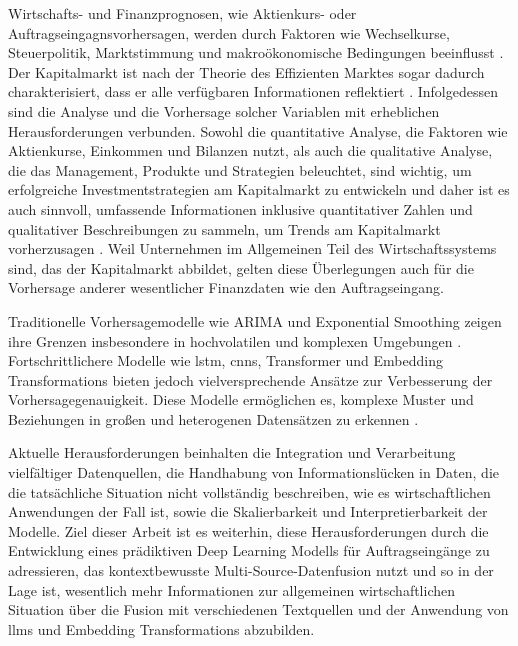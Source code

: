 \documentclass[lettersize,journal]{IEEEtran}
\begin{document}
Wirtschafts- und Finanzprognosen, wie Aktienkurs- oder Auftragseingagnsvorhersagen, werden durch Faktoren wie Wechselkurse, Steuerpolitik, Marktstimmung und makroökonomische Bedingungen beeinflusst \cite{Zhang2018ImprovinStockMarketPrediction}. Der Kapitalmarkt ist nach der Theorie des Effizienten Marktes sogar dadurch charakterisiert, dass er alle verfügbaren Informationen reflektiert \cite{Fama1970EfficientMarkets}. Infolgedessen sind die Analyse und die Vorhersage solcher Variablen mit erheblichen Herausforderungen verbunden. Sowohl die quantitative Analyse, die Faktoren wie Aktienkurse, Einkommen und Bilanzen nutzt, als auch die qualitative Analyse, die das Management, Produkte und Strategien beleuchtet, sind wichtig, um erfolgreiche Investmentstrategien am Kapitalmarkt zu entwickeln und daher ist es auch sinnvoll, umfassende Informationen inklusive quantitativer Zahlen und qualitativer Beschreibungen zu sammeln, um Trends am Kapitalmarkt vorherzusagen \cite{Zhang2018ImprovinStockMarketPrediction}. Weil Unternehmen im Allgemeinen Teil des Wirtschaftssystems sind, das der Kapitalmarkt abbildet, gelten diese Überlegungen auch für die Vorhersage anderer wesentlicher Finanzdaten wie den Auftragseingang.

Traditionelle Vorhersagemodelle wie ARIMA und Exponential Smoothing zeigen ihre Grenzen insbesondere in hochvolatilen und komplexen Umgebungen \cite{Wasserbacher2022machinelearningfpa}. Fortschrittlichere Modelle wie \gls{lstm}, \glspl{cnn}, Transformer und Embedding Transformations bieten jedoch vielversprechende Ansätze zur Verbesserung der Vorhersagegenauigkeit. Diese Modelle ermöglichen es, komplexe Muster und Beziehungen in großen und heterogenen Datensätzen zu erkennen \cite{mo2024backgroundawaremultisourcefusionfinancial}.

Aktuelle Herausforderungen beinhalten die Integration und Verarbeitung vielfältiger Datenquellen, die Handhabung von Informationslücken in Daten, die die tatsächliche Situation nicht vollständig beschreiben, wie es wirtschaftlichen Anwendungen der Fall ist, sowie die Skalierbarkeit und Interpretierbarkeit der Modelle. Ziel dieser Arbeit ist es weiterhin, diese Herausforderungen durch die Entwicklung eines prädiktiven Deep Learning Modells für Auftragseingänge zu adressieren, das kontextbewusste Multi-Source-Datenfusion nutzt und so in der Lage ist, wesentlich mehr Informationen zur allgemeinen wirtschaftlichen Situation über die Fusion mit verschiedenen Textquellen und der Anwendung von \glspl{llm} und Embedding Transformations abzubilden.
\end{document}
